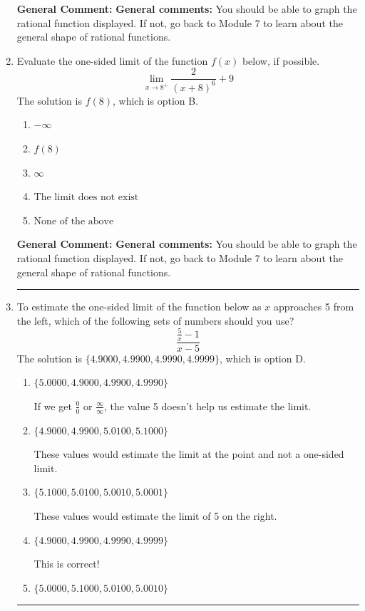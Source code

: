 \documentclass{extbook}[14pt]
\newcommand{\litem}[1]{\item #1

\rule{\textwidth}{0.4pt}}
\begin{document}
\begin{enumerate}
{\begin{enumerate}[label=\Alph*.]
\end{enumerate}

\textbf{General Comment:} \textbf{General comments:} You should be able to graph the rational function displayed. If not, go back to Module 7 to learn about the general shape of rational functions.
}
\litem{
Evaluate the one-sided limit of the function $f(x)$ below, if possible.
\[ \lim_{x \rightarrow 8^+} \frac{2}{(x+8)^6}+9 \]The solution is \( f(8) \), which is option B.\begin{enumerate}[label=\Alph*.]
\item \( -\infty \)


\item \( f(8) \)


\item \( \infty \)


\item \( \text{The limit does not exist} \)


\item \( \text{None of the above} \)


\end{enumerate}

\textbf{General Comment:} \textbf{General comments:} You should be able to graph the rational function displayed. If not, go back to Module 7 to learn about the general shape of rational functions.
}
\litem{
To estimate the one-sided limit of the function below as $x$ approaches 5 from the left, which of the following sets of numbers should you use?
\[ \frac{\frac{5}{x} - 1}{x - 5} \]The solution is \( \{ 4.9000, 4.9900, 4.9990, 4.9999 \} \), which is option D.\begin{enumerate}[label=\Alph*.]
\item \( \{ 5.0000, 4.9000, 4.9900, 4.9990 \} \)

If we get $\frac{0}{0}$ or $\frac{\infty}{\infty}$, the value 5 doesn't help us estimate the limit.
\item \( \{ 4.9000, 4.9900, 5.0100, 5.1000 \} \)

These values would estimate the limit at the point and not a one-sided limit.
\item \( \{ 5.1000, 5.0100, 5.0010, 5.0001 \} \)

These values would estimate the limit of 5 on the right.
\item \( \{ 4.9000, 4.9900, 4.9990, 4.9999 \} \)

This is correct!
\item \( \{ 5.0000, 5.1000, 5.0100, 5.0010 \} \)


\end{enumerate}}
\end{enumerate}
\end{document}
